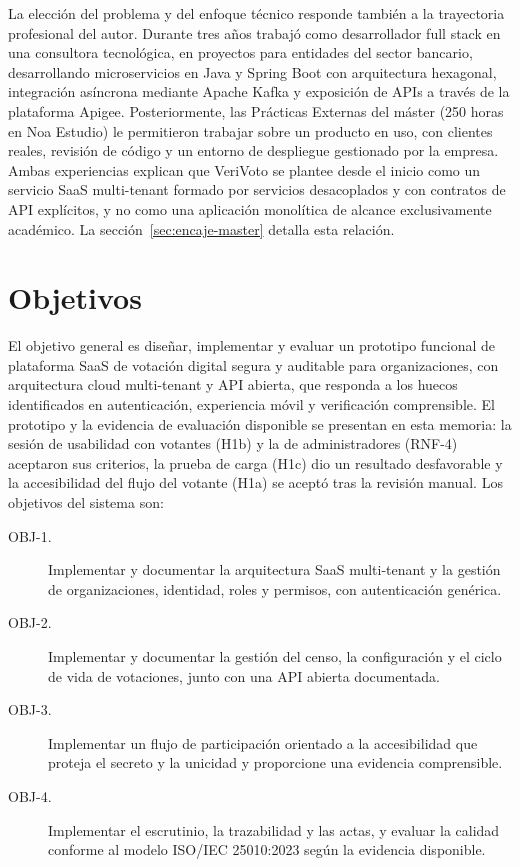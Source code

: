 La elección del problema y del enfoque técnico responde también a la
trayectoria profesional del autor. Durante tres años trabajó como
desarrollador full stack en una consultora tecnológica, en proyectos para
entidades del sector bancario, desarrollando microservicios en Java y Spring
Boot con arquitectura hexagonal, integración asíncrona mediante Apache Kafka
y exposición de APIs a través de la plataforma Apigee. Posteriormente, las
Prácticas Externas del máster (250 horas en Noa Estudio) le permitieron
trabajar sobre un producto en uso, con clientes reales, revisión de código y
un entorno de despliegue gestionado por la empresa. Ambas experiencias
explican que VeriVoto se plantee desde el inicio como un servicio SaaS
multi-tenant formado por servicios desacoplados y con contratos de API
explícitos, y no como una aplicación monolítica de alcance exclusivamente
académico. La sección~\ref{sec:encaje-master} detalla esta relación.

\section{Objetivos}
\label{sec:objetivos}

El objetivo general es diseñar, implementar y evaluar un prototipo funcional
de plataforma SaaS de votación digital segura y auditable para organizaciones,
con arquitectura cloud multi-tenant y API abierta, que responda a los huecos
identificados en autenticación, experiencia móvil y verificación comprensible.
El prototipo y la evidencia de evaluación disponible se presentan en esta
memoria: la sesión de usabilidad con votantes (H1b) y la de administradores
(RNF-4) aceptaron sus criterios, la prueba de carga (H1c) dio un resultado
desfavorable y la accesibilidad del flujo del votante (H1a) se aceptó tras la revisión manual. Los objetivos del sistema son:

\begin{description}
  \item[OBJ-1.] Implementar y documentar la arquitectura SaaS multi-tenant y la gestión de
  organizaciones, identidad, roles y permisos, con autenticación genérica.
  \item[OBJ-2.] Implementar y documentar la gestión del censo, la configuración y el ciclo de
  vida de votaciones, junto con una API abierta documentada.
  \item[OBJ-3.] Implementar un flujo de participación orientado a la accesibilidad que
  proteja el secreto y la unicidad y proporcione una evidencia comprensible.
  \item[OBJ-4.] Implementar el escrutinio, la trazabilidad y las actas, y evaluar
  la calidad conforme al modelo ISO/IEC 25010:2023 según la evidencia disponible.
\end{description}

